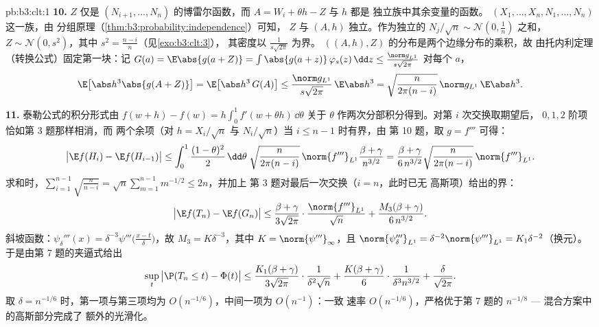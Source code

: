 \begin{solution}{pb:b3:clt:1}
\textbf{10.} $Z$ 仅是 $(N_{i+1}, \dots,
N_n)$ 的博雷尔函数，而 $A = W_i + \theta h - Z$ 与 $h$ 都是
独立族中其余变量的函数。
$(X_1, \dots, X_n, N_1, \dots, N_n)$ 这一族，由
分组原理（\cref{thm:b3:probability:independence}）可知，
$Z$ 与 $(A, h)$ 独立。作为独立的
$N_j/\sqrt n \sim \mathcal N(0, \frac1n)$ 之和，$Z \sim \mathcal
N(0, s^2)$，其中 $s^2 = \frac{n-i}n$（见\cref{exo:b3:clt:3}），
其密度以 $\frac1{s\sqrt{2\pi}}$ 为界。
$((A, h), Z)$ 的分布是两个边缘分布的乘积，故
由托内利定理（转换公式）固定第一块：记 $G(a) =
\E\abs{g(a + Z)} = \int\abs{g(a + z)}\,\varphi_s(z)\,\dd z
\leq \frac{\norm g_{L^1}}{s\sqrt{2\pi}}$ 对每个 $a$，
\[
\E\bigl[\abs h^3\abs{g(A + Z)}\bigr] =
\E\bigl[\abs h^3\,G(A)\bigr] \leq
\frac{\norm g_{L^1}}{s\sqrt{2\pi}}\,\E\abs h^3
= \sqrt{\frac{n}{2\pi(n-i)}}\,\norm g_{L^1}\,\E\abs h^3 .
\]

\textbf{11.} 泰勒公式的积分形式由
$f(w + h) - f(w) =
h\int_0^1f'(w + \theta h)\,\dd\theta$ 关于
$\theta$ 作两次分部积分得到。对第 $i$ 次交换取期望后，
$0, 1, 2$ 阶项恰如第 3 题那样相消，而
两个余项（对 $h = X_i/\sqrt n$
与 $N_i/\sqrt n$）当 $i \leq n - 1$ 时有界，由
第 10 题，取 $g = f'''$ 可得：
\[
\bigl|\E f(H_i) - \E f(H_{i-1})\bigr| \leq
\int_0^1\frac{(1-\theta)^2}2\,\dd\theta\;
\sqrt{\frac{n}{2\pi(n-i)}}\,\norm{f'''}_{L^1}
\frac{\beta + \gamma}{n^{3/2}}
= \frac{\beta + \gamma}{6\,n^{3/2}}
\sqrt{\frac{n}{2\pi(n-i)}}\,\norm{f'''}_{L^1} .
\]
求和时，$\sum_{i=1}^{n-1}\sqrt{\frac n{n-i}} =
\sqrt n\sum_{m=1}^{n-1}m^{-1/2} \leq 2n$，并加上
第 3 题对最后一次交换（$i = n$，此时已无
高斯项）给出的界：
\[
\bigl|\E f(T_n) - \E f(G_n)\bigr| \leq
\frac{\beta + \gamma}{3\sqrt{2\pi}}\cdot
\frac{\norm{f'''}_{L^1}}{\sqrt n} +
\frac{M_3(\beta + \gamma)}{6\,n^{3/2}} .
\]
斜坡函数：$\psi_\delta'''(x) =
\delta^{-3}\psi'''\bigl(\frac{x - t}\delta\bigr)$，故
$M_3 = K\delta^{-3}$，其中 $K = \norm{\psi'''}_\infty$，且
$\norm{\psi_\delta'''}_{L^1} = \delta^{-2}
\norm{\psi'''}_{L^1} = K_1\delta^{-2}$（换元）。
于是由第 7 题的夹逼式给出
\[
\sup_t\,\bigl|\P(T_n \leq t) - \Phi(t)\bigr| \leq
\frac{K_1(\beta + \gamma)}{3\sqrt{2\pi}}\cdot
\frac1{\delta^2\sqrt n} +
\frac{K(\beta + \gamma)}{6}\cdot
\frac1{\delta^3n^{3/2}} + \frac\delta{\sqrt{2\pi}} .
\]
取 $\delta = n^{-1/6}$ 时，第一项与第三项均为
$O(n^{-1/6})$，中间一项为 $O(n^{-1})$：一致
速率 $O(n^{-1/6})$，严格优于第 7 题的
$n^{-1/8}$ --- 混合方案中的高斯部分完成了
额外的光滑化。


\end{solution}
